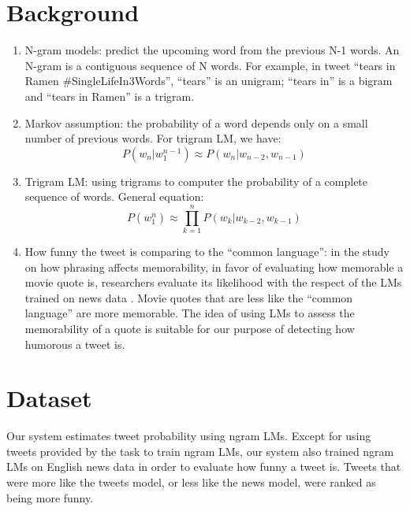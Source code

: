\documentclass[a0,portrait]{a0poster}
\begin{document}
\begin{multicols}{2}
\section*{\LARGE Background}
\begin{enumerate}
\item N-gram models: predict the upcoming word from the previous N-1 words. An N-gram is a contiguous sequence of N words. For example, in tweet ``tears in Ramen \#SingleLifeIn3Words'', ``tears'' is an unigram; ``tears in'' is a bigram and ``tears in Ramen'' is a trigram.
\item Markov assumption: the probability of a word depends only on a small number of previous words. For trigram LM, we have:
\begin{equation}
P(w_n|w_1^{n-1})\approx P(w_n|w_{n-2}, w_{n-1})
\end{equation}
\item Trigram LM: using trigrams to computer the probability of a complete sequence of words. General equation:
\begin{equation}
P(w_1^n)\approx \prod_{k=1}^{n} P(w_k|w_{k-2}, w_{k-1})
\end{equation}
\item How funny the tweet is comparing to the ``common language'': in the study on how phrasing affects memorability, in favor of evaluating how memorable a movie quote is, researchers evaluate its likelihood with the respect of the LMs trained on news data \cite{hello}. Movie quotes that are less like the ``common language'' are more memorable. The idea of using LMs to assess the memorability of a quote is suitable for our purpose of detecting how humorous a tweet is. 
\end{enumerate}

\color{Navy}

\section*{\LARGE Dataset}
Our system estimates tweet probability using ngram LMs. Except for using tweets provided by the task to train ngram LMs, our system also trained ngram LMs on English news data in order to evaluate how funny a tweet is. Tweets that were more like the tweets model, or less like the news model, were ranked as being more funny.


\end{multicols}
\end{document}
